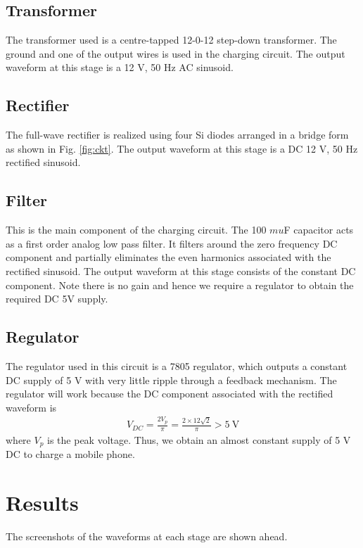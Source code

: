 \documentclass[journal,12pt,twocolumn]{IEEEtran}
\begin{document}
\subsection{Transformer}
The transformer used is a centre-tapped 12-0-12 step-down 
transformer. The ground and one of the output wires is used
in the charging circuit. The output waveform at this stage is
a 12 V, 50 Hz AC sinusoid.

\subsection{Rectifier}
The full-wave rectifier is realized using four Si diodes arranged in a
bridge form as shown in Fig. \ref{fig:ckt}. The output waveform at this
stage is a DC 12 V, 50 Hz rectified sinusoid.

\subsection{Filter}
This is the main component of the charging circuit. The 100 $mu$F
capacitor acts as a first order analog low pass filter. It filters
around the zero frequency DC component and partially eliminates the
even harmonics associated with the rectified sinusoid. The output 
waveform at this stage consists of the constant DC component. Note
there is no gain and hence we require a regulator to obtain the
required DC 5V supply.

\subsection{Regulator}
The regulator used in this circuit is a 7805 regulator, which outputs
a constant DC supply of 5 V with very little ripple through a 
feedback mechanism. The regulator will work because the DC component 
associated with the rectified waveform is
\begin{align}
    V_{DC} = \frac{2V_p}{\pi} = \frac{2\times12\sqrt{2}}{\pi} > \SI{5}{\V}
\end{align}
where $V_p$ is the peak voltage. Thus, we obtain an almost
constant supply of 5 V DC to charge a mobile phone.

\section{Results}
The screenshots of the waveforms at each stage are shown ahead.
\end{document}
